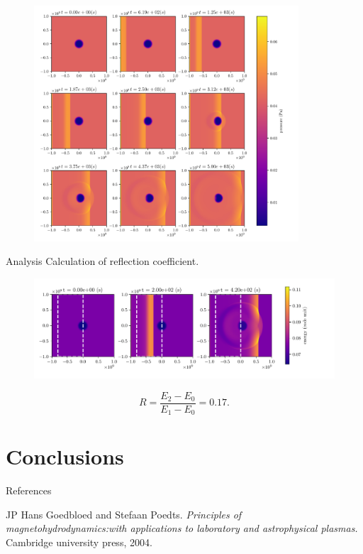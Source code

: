 \documentclass{beamer}
\begin{document}
\begin{frame}
	\begin{figure}[h]
		\centering
		\includegraphics[width=0.88\textwidth]{../report/figures/hole_time.pdf}
	\end{figure}
\end{frame}
\begin{frame}{Analysis}
	Calculation of reflection coefficient.
	\begin{figure}[h]
		\centering
		\includegraphics[width=\textwidth]{figures/reflection_coefficient.pdf}
	\end{figure}	
	\[
	R = \frac{E_2 - E_0}{E_1 - E_0} = 0.17
	.\] 
\end{frame}
\section{Conclusions}
\begin{frame}

\end{frame}
\begin{frame}{References}
    \begin{itemize}\footnotesize{
        \item JP Hans Goedbloed and Stefaan Poedts. \textit{Principles of magnetohydrodynamics:with applications to laboratory and astrophysical plasmas.} Cambridge university press, 2004.
    }
    \end{itemize}
\end{frame}
\end{document}
